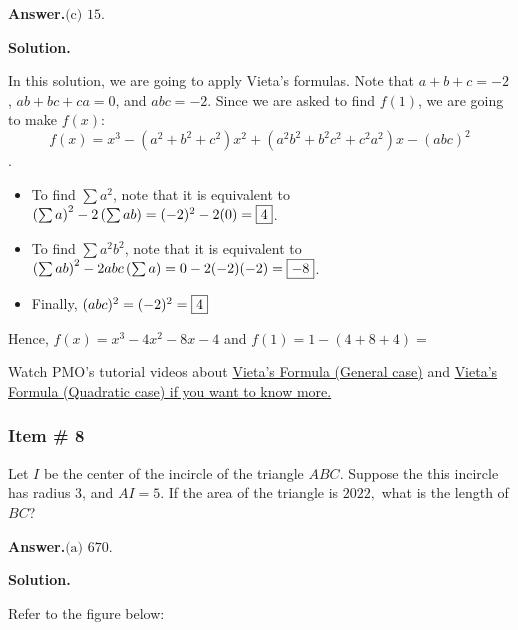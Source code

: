 \documentclass[11pt,paper=letter]{scrartcl}
\newcommand{\ans}[1]{{\sffamily \bfseries Answer.}\;\(\boxed{\text{#1}}\).}
\newcommand{\sol}{{\sffamily \bfseries Solution.}\;}
\newenvironment{rem}%
{\noindent \ignorespaces \small \sffamily  \sansmath {\bfseries \color{DarkMidnightBlue} Remark.}}%
{\ignorespacesafterend}
\begin{document}
\ans{(c) 15}

\sol

In this solution, we are going to apply Vieta's formulas. Note that $a+b+c = -2$, $ab+bc+ca = 0$, and $abc = -2$. Since we are asked to find $f(1)$, we are going to make $f(x)$: $$f(x) = x^3 - (a^2 + b^2 + c^2)x^2 + (a^2b^2+b^2c^2+c^2a^2)x - (abc)^2$$. 

\begin{itemize}
    \item To find $\sum a^2$, note that it is equivalent to $\left(\sum a\right)^2 -2\left(\sum ab\right) = (-2)^2 - 2(0) = \fbox{4}$. 
    
    \item To find $\sum a^2b^2$, note that it is equivalent to $\left(\sum ab\right)^2 -2abc\left(\sum a\right)= 0 -2(-2)(-2) = \fbox{$-8$}$. 
    
    \item Finally, $(abc)^2 = (-2)^2 = \fbox{4}$
\end{itemize}

Hence, $f(x) = x^3 -4x^2 -8x - 4$ and $f(1) = 1 - (4+8+4) = $ 

\begin{mdframed}
\begin{rem}
Watch PMO's tutorial videos about \href{https://www.youtube.com/watch?v=yT1-mWubPxs}{Vieta's Formula (General case)} and \href{https://www.youtube.com/watch?v=M53VPK1ZnuI&t=267s}{Vieta's Formula (Quadratic case) if you want to know more.}
\end{rem}

\end{mdframed}


\subsubsection{Item \# 8}

\begin{probboxed}
Let $I$ be the center of the incircle of the triangle $ABC.$ Suppose the this incircle has radius 3, and $AI =5.$ If the area of the triangle is $2022,$ what is the length of $BC$?
   
\end{probboxed}

\ans{(a) 670}

\sol

Refer to the figure below:
\end{document}

